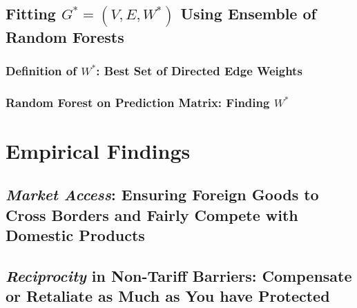 \documentclass[12pt,letterpaper]{article}
\begin{document}
\subsection{Fitting $G^* = (V, E, W^*)$ Using Ensemble of Random Forests}
\subsubsection{Definition of $W^*$: Best Set of Directed Edge Weights} %


\subsubsection{Random Forest on Prediction Matrix: Finding $W^*$} %


\section{Empirical Findings} %


\subsection{\textit{Market Access}: Ensuring Foreign Goods to Cross Borders and Fairly Compete with Domestic Products}




\subsection{\textit{Reciprocity} in Non-Tariff Barriers: Compensate or Retaliate as Much as You have Protected}

\end{document}
